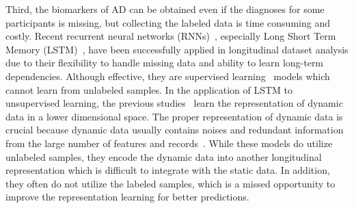 Third, the biomarkers of AD can be obtained even if the diagnoses for some participants is missing, but collecting the labeled data is time consuming and costly. Recent recurrent neural networks (RNNs)~\cite{medsker2001recurrent}, especially Long Short Term Memory (LSTM)~\cite{schmidhuber1997long}, have been successfully applied in longitudinal dataset analysis due to their flexibility to handle missing data and ability to learn long-term dependencies. Although effective, they are supervised learning~\cite{vieira2017using,hong2019predicting,tabarestani2019longitudinal} models which cannot learn from unlabeled samples. In the application of LSTM to unsupervised learning, the previous studies~\cite{langkvist2014review,srivastava2015unsupervised} learn the representation of dynamic data in a lower dimensional space. The proper representation of dynamic data is crucial because dynamic data usually contains noises and redundant information from the large number of features and records~\cite{tuncel2018autoregressive,langkvist2014review}. While these models do utilize unlabeled samples, they encode the dynamic data into another longitudinal representation which is difficult to integrate with the static data. In addition, they often do not utilize the labeled samples, which is a missed opportunity to improve the representation learning for better predictions.


